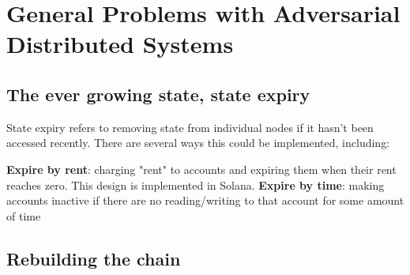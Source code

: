 \chapter{General Problems with Adversarial Distributed Systems}
\section{The ever growing state, state expiry}
State expiry refers to removing state from individual nodes if it hasn't been accessed recently. There are several ways this could be implemented, including:

\textbf{Expire by rent}: charging "rent" to accounts and expiring them when their rent reaches zero. This design is implemented in Solana.
\textbf{Expire by time}: making accounts inactive if there are no reading/writing to that account for some amount of time


\section{Rebuilding the chain}
